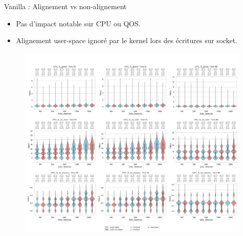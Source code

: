 \documentclass[aspectratio=43,8pt]{beamer}
\begin{document}
\begin{frame}{Vanilla : Alignement vs non-alignement}
\begin{itemize}
    \item Pas d'impact notable sur CPU ou QOS.
    \item Alignement user-space ignoré par le kernel lors des écritures sur socket.
\end{itemize}
\begin{figure}
    \includegraphics[width=\textwidth]{results/results-cmp/vanilla_aligned_vs_unaligned.png}
\end{figure}
\end{frame}
\end{document}
